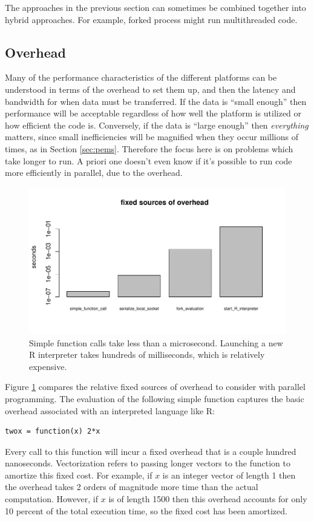 \documentclass[12pt]{article}
\begin{document}
The approaches in the previous section can sometimes be combined together
into hybrid approaches. For example, forked process might run multithreaded
code.

\subsection{Overhead}

Many of the performance characteristics of the different platforms can be
understood in terms of the overhead to set them up, and then the latency
and bandwidth for when data must be transferred.  If the data is ``small
enough'' then performance will be acceptable regardless of how well the
platform is utilized or how efficient the code is. Conversely, if the data
is ``large enough'' then \emph{everything} matters, since small
inefficiencies will be magnified when they occur millions of times, as in
Section \ref{sec:pems}.  Therefore the focus here is on problems which take longer
to run. A priori one doesn't even know if it's possible to run code more
efficiently in parallel, due to the overhead.

\begin{figure}
\centering
\includegraphics[width=.8\linewidth]{compute_times/overhead}
\caption{Simple function calls take less than a microsecond. Launching a
    new R interpreter takes hundreds of milliseconds, which is relatively expensive.}
\label{fig:overhead}
\end{figure}

Figure \ref{fig:overhead} compares the relative fixed sources of overhead to
consider with parallel programming. The evaluation of the following simple
function captures the basic overhead associated with an interpreted
language like R:
\begin{verbatim}
twox = function(x) 2*x
\end{verbatim}
Every call to this function will incur a fixed overhead that is a couple
hundred nanoseconds. Vectorization refers to passing longer vectors to the
function to amortize this fixed cost. For example, if $x$ is an integer
vector of length 1 then the overhead takes 2 orders of magnitude more time
than the actual computation. However, if $x$ is of length 1500 then this
overhead accounts for only 10 percent of the total execution time, so the
fixed cost has been amortized.
\end{document}
